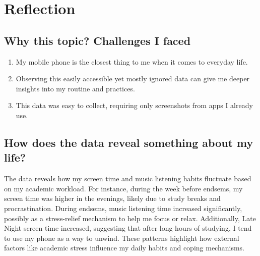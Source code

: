 \documentclass[24pt]{article}
\begin{document}
\section{Reflection}
\subsection*{Why this topic? Challenges I faced}
\begin{enumerate}
    \item My mobile phone is the closest thing to me when it comes to everyday life.
    \item Observing this easily accessible yet mostly ignored data can give me deeper insights into my routine and practices.
    \item This data was easy to collect, requiring only screenshots from apps I already use.
\end{enumerate}

\subsection*{How does the data reveal something about my life?}
The data reveals how my screen time and music listening habits fluctuate based on my academic workload. For instance, during the week before endsems, my screen time was higher in the evenings, likely due to study breaks and procrastination. During endsems, music listening time increased significantly, possibly as a stress-relief mechanism to help me focus or relax. Additionally, Late Night screen time increased, suggesting that after long hours of studying, I tend to use my phone as a way to unwind. These patterns highlight how external factors like academic stress influence my daily habits and coping mechanisms.
\end{document}
